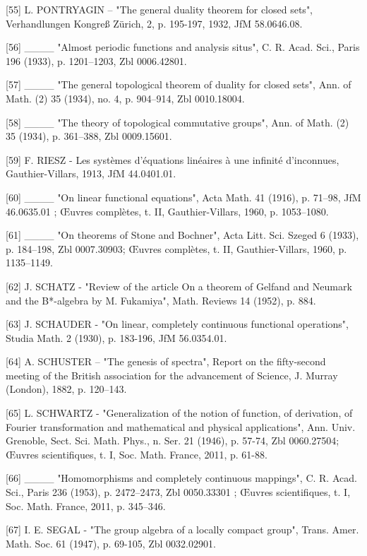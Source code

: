 {[}55{]} L. PONTRYAGIN -- "The general duality theorem for closed sets", Verhandlungen Kongreß Zürich, 2, p. 195-197, 1932, JfM 58.0646.08.

{[}56{]} \_\_\_\_ "Almost periodic functions and analysis situs", C. R. Acad. Sci., Paris 196 (1933), p. 1201--1203, Zbl 0006.42801.

{[}57{]} \_\_\_\_ "The general topological theorem of duality for closed sets", Ann. of Math. (2) 35 (1934), no. 4, p. 904--914, Zbl 0010.18004.

{[}58{]} \_\_\_\_ "The theory of topological commutative groups", Ann. of Math. (2) 35 (1934), p. 361--388, Zbl 0009.15601.

{[}59{]} F. RIESZ - Les systèmes d'équations linéaires à une infinité d'inconnues, Gauthier-Villars, 1913, JfM 44.0401.01.

{[}60{]} \_\_\_\_ "On linear functional equations", Acta Math. 41 (1916), p. 71--98, JfM 46.0635.01 ; Œuvres complètes, t. II, Gauthier-Villars, 1960, p. 1053--1080.

{[}61{]} \_\_\_\_ "On theorems of Stone and Bochner", Acta Litt. Sci. Szeged 6 (1933), p. 184--198, Zbl 0007.30903; Œuvres complètes, t. II, Gauthier-Villars, 1960, p. 1135--1149.

{[}62{]} J. SCHATZ - "Review of the article On a theorem of Gelfand and Neumark and the B*-algebra by M. Fukamiya", Math. Reviews 14 (1952), p. 884.

{[}63{]} J. SCHAUDER - "On linear, completely continuous functional operations", Studia Math. 2 (1930), p. 183-196, JfM 56.0354.01.

{[}64{]} A. SCHUSTER -- "The genesis of spectra", Report on the fifty-second meeting of the British association for the advancement of Science, J. Murray (London), 1882, p. 120--143.

{[}65{]} L. SCHWARTZ - "Generalization of the notion of function, of derivation, of Fourier transformation and mathematical and physical applications", Ann. Univ. Grenoble, Sect. Sci. Math. Phys., n. Ser. 21 (1946), p. 57-74, Zbl 0060.27504; Œuvres scientifiques, t. I, Soc. Math. France, 2011, p. 61-88.

{[}66{]} \_\_\_\_ "Homomorphisms and completely continuous mappings", C. R. Acad. Sci., Paris 236 (1953), p. 2472--2473, Zbl 0050.33301 ; Œuvres scientifiques, t. I, Soc. Math. France, 2011, p. 345--346.

{[}67{]} I. E. SEGAL - "The group algebra of a locally compact group", Trans. Amer. Math. Soc. 61 (1947), p. 69-105, Zbl 0032.02901.

